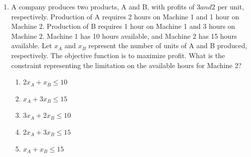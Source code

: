 \documentclass{article}%
\begin{document}
\begin{enumerate}
\begin{enumerate}
\end{enumerate}%
\vspace{1em}%
\item A company produces two products, A and B, with profits of $3 and $2 per unit, respectively. Production of A requires 2 hours on Machine 1 and 1 hour on Machine 2. Production of B requires 1 hour on Machine 1 and 3 hours on Machine 2. Machine 1 has 10 hours available, and Machine 2 has 15 hours available. Let $x_A$ and $x_B$ represent the number of units of A and B produced, respectively.  The objective function is to maximize profit. What is the constraint representing the limitation on the available hours for Machine 2?%
\begin{enumerate}%
\item $2x_A + x_B \le 10$%
\item $x_A + 3x_B \le 15$%
\item $3x_A + 2x_B \le 10$%
\item $2x_A + 3x_B \le 15$%
\item $x_A + x_B \le 15$%
\end{enumerate}%
\vspace{1em}%
\end{enumerate}

%
\newpage%
\end{document}
